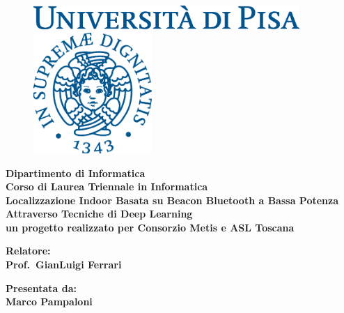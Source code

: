 \documentclass[12pt]{report}
\begin{document}
\begin{titlepage}
  \begin{figure}[t]
    \centering\includegraphics[width=0.9\textwidth]{./img/logo.eps}

    \vspace{1cm}

    \centering\includegraphics[width=0.4\textwidth]{./img/cherubino.eps}
  \end{figure}

  \begin{center}
    \textbf{ Dipartimento di Informatica\\ Corso di Laurea Triennale in Informatica\\}
    \vspace{15mm}
    {\LARGE{\bf Localizzazione Indoor Basata su Beacon Bluetooth a Bassa Potenza
        Attraverso Tecniche di Deep Learning}}\\
    {\large{\bf un progetto realizzato per Consorzio Metis e ASL Toscana}} \\
  \end{center}

  \vspace{20mm}

  \begin{minipage}[t]{0.47\textwidth}
    {\large{\bf Relatore:\\ Prof.\ GianLuigi Ferrari 
      }}
  \end{minipage}\hfill
  \begin{minipage}[t]{0.47\textwidth}\raggedleft
    {\large{\bf Presentata da: \\ Marco Pampaloni}}
  \end{minipage}

  \vfill



\end{titlepage}
\end{document}
